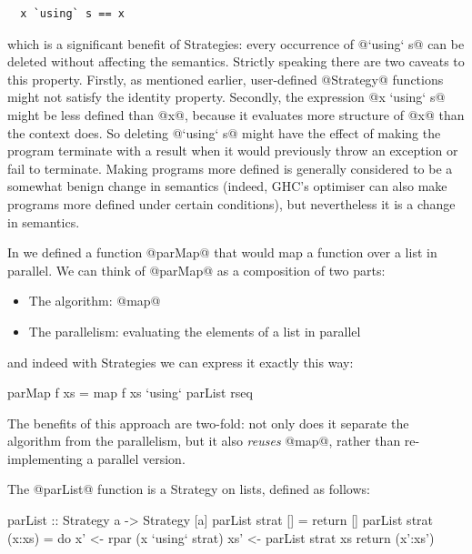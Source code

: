 {\small \begin{verbatim}
  x `using` s == x
\end{verbatim}}

\noindent which is a significant benefit of Strategies: every
occurrence of @`using` s@ can be deleted without affecting the
semantics.  Strictly speaking there are two caveats to this property.
Firstly, as mentioned earlier, user-defined @Strategy@ functions might
not satisfy the identity property.  Secondly, the expression @x `using` s@ might be
less defined than @x@, because it evaluates more structure of @x@ than
the context does.  So deleting @`using` s@ might have the effect of
making the program terminate with a result when it would previously
throw an exception or fail to terminate.  Making programs more defined
is generally considered to be a somewhat benign change in semantics
(indeed, GHC's optimiser can also make programs more defined under
certain conditions), but nevertheless it is a change in semantics.


In  we defined a function @parMap@ that would map a
function over a list in parallel.  We can think of @parMap@ as a
composition of two parts:

\begin{itemize}
\item The algorithm: @map@
\item The parallelism: evaluating the elements of a list in parallel
\end{itemize}

\noindent and indeed with Strategies we can express it exactly this
way:

\begin{haskell}
parMap f xs = map f xs `using` parList rseq
\end{haskell}

\noindent The benefits of this approach are two-fold: not only does it
separate the algorithm from the parallelism, but it also \emph{reuses}
@map@, rather than re-implementing a parallel version.

The @parList@ function is a Strategy on lists, defined as follows:

\begin{haskell}
parList :: Strategy a -> Strategy [a]
parList strat []     = return []
parList strat (x:xs) = do
  x'  <- rpar (x `using` strat)
  xs' <- parList strat xs
  return (x':xs')
\end{haskell}

